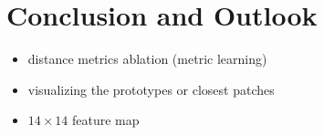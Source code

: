 \chapter{Conclusion and Outlook}

\begin{itemize}
    \item distance metrics ablation (metric learning)
    \item visualizing the prototypes or closest patches
    \item $14 \times 14$ feature map
\end{itemize}


